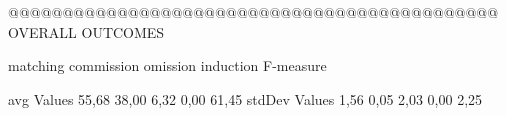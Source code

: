 @@@@@@@@@@@@@@@@@@@@@@@@@@@@@@@@@@@@@@@@@@@@@ OVERALL OUTCOMES

                matching commission   omission  induction    F-measure   

avg Values      55,68      38,00       6,32      0,00        61,45      
stdDev Values   1,56       0,05       2,03      0,00         2,25




